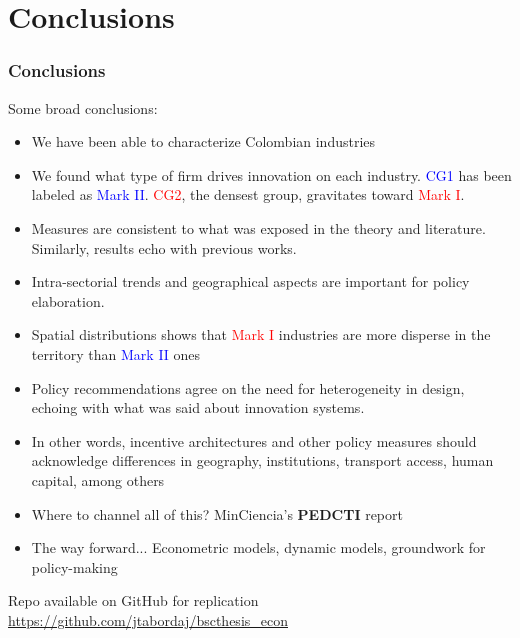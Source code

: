 \documentclass{beamer}
\begin{document}
\section{Conclusions}
	\begin{frame}[allowframebreaks]
		\frametitle{Conclusions}
		Some broad conclusions:
		\begin{itemize}
			\item We have been able to characterize Colombian industries
			\item We found what type of firm drives innovation on each industry. \textcolor{blue}{CG1} has been labeled as \textcolor{blue}{Mark II}. \textcolor{red}{CG2}, the densest group, gravitates toward \textcolor{red}{Mark I}.
			\item Measures are consistent to what was exposed in the theory and literature. Similarly, results echo with previous works.
			\item Intra-sectorial trends and geographical aspects are important for policy elaboration.
			\item Spatial distributions shows that \textcolor{red}{Mark I} industries are more disperse
			in the territory than \textcolor{blue}{Mark II} ones
		\pagebreak
			\item Policy recommendations agree on the need for heterogeneity in design, echoing with what was said about innovation systems.
			\item In other words, incentive architectures and other policy measures should acknowledge differences in geography, institutions, transport access, human capital, among others
			\item Where to channel all of this? MinCiencia's \textbf{PEDCTI} report
			\item The way forward... Econometric models, dynamic models, groundwork for policy-making
		\end{itemize}
		\pagebreak
		Repo available on GitHub for replication \href{https://github.com/jtabordaj/bscthesis_econ}{https://github.com/jtabordaj/bscthesis\_econ}
	\end{frame}
\end{document}
